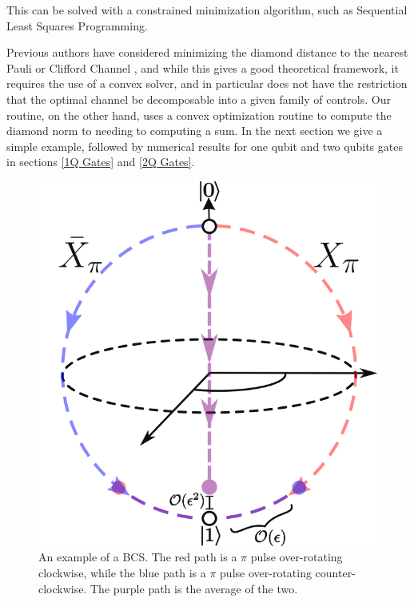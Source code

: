 \documentclass[aps,nofootinbib,pra,notitlepage,twocolumn]{revtex4-1}
\begin{document}
This can be solved with a constrained minimization algorithm, such as Sequential Least Squares Programming\cite{wright1999numerical}.

Previous authors have considered minimizing the diamond distance to the nearest Pauli or Clifford Channel \cite{Magesan2013}, and while this gives a good theoretical framework, it requires the use of a convex solver, and in particular does not have the restriction that the optimal channel be decomposable into a given family of controls. Our routine, on the other hand, uses a convex optimization routine to compute the diamond norm to needing to computing a sum. In the next section we give a simple example, followed by numerical results for one qubit and two qubits gates in sections \ref{1Q Gates} and \ref{2Q Gates}.

\begin{figure}
  \centering
  \includegraphics[width=.75\columnwidth]{simple_example.png}
  \caption{An example of a BCS. The red path is a $\pi$ pulse over-rotating clockwise, while the blue path is a $\pi$ pulse over-rotating counter-clockwise. The purple path is the average of the two.}
  \label{fig:simple_example}
\end{figure}
\end{document}
